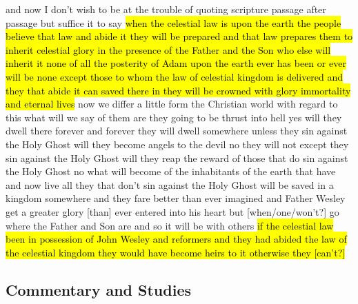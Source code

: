		\begin{compactdesc} %
			\item[{\hyperref[EMS-1865-BY-8-OCT-1865]{8 October 1865}}] and now I don't wish to be at the trouble of quoting scripture passage after passage but suffice it to say \hl{when the celestial law is upon the earth the people believe that law and abide it they will be prepared and that law prepares them to inherit celestial glory in the presence of the Father and the Son who else will inherit it none of all the posterity of Adam upon the earth ever has been or ever will be none except those to whom the law of celestial kingdom is delivered and they that abide it can saved there in they will be crowned with glory immortality and eternal lives} now we differ a little form the Christian world with regard to this what will we say of them are they going to be thrust into hell yes will they dwell there forever and forever they will dwell somewhere unless they sin against the Holy Ghost will they become angels to the devil no they will not except they sin against the Holy Ghost will they reap the reward of those that do sin against the Holy Ghost no what will become of the inhabitants of the earth that have and now live all they that don't sin against the Holy Ghost will be saved in a kingdom somewhere and they fare better than ever imagined and Father Wesley get a greater glory [than] ever entered into his heart but [when/one/won't?] go where the Father and Son are and so it will be with others \hl{if the celestial law been in possession of John Wesley and reformers and they had abided the law of the celestial kingdom they would have become heirs to it otherwise they [can't?]}
		\end{compactdesc}
	
\subsection{Commentary and Studies} %
	\label{LAW-COMMENTARY}

	
		
